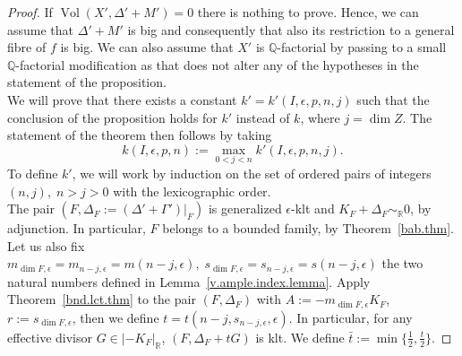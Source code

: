 \documentclass{amsart}[12pt,a4paper]
\theoremstyle{definition}
\DeclareMathOperator{\Vol}{\mathrm{Vol}}
\newcommand{\rr}{\mathbb{R}}
\newcommand{\sje}{s_{n-j, \epsilon}}
\newcommand{\mje}{m_{n-j, \epsilon}}
\newcommand{\mfe}{m_{\dim F, \epsilon}}
\newcommand{\sfe}{s_{\dim F, \epsilon}}
\begin{document}
\begin{proof}
If $\Vol(X', \Delta'+M')=0$ there is nothing to prove.
Hence, we can assume that $\Delta'+M'$ is big and consequently that also its restriction to a general fibre of $f$ is big.
We can also assume that $X'$ is $\mathbb{Q}$-factorial by passing to a small $\mathbb{Q}$-factorial modification as that does not alter any of the hypotheses in the statement of the proposition.
\\
We will prove that there exists a constant $k'=k'(I, \epsilon, p, n, j)$ such that the conclusion of the proposition holds for $k'$ instead of $k$, where $j=\dim Z$.
The statement of the theorem then follows by taking 
\[
k(I, \epsilon, p, n):= \max_{0<j<n} k'(I, \epsilon, p, n, j).
\]
To define $k'$, we will work by induction on the set of ordered pairs of integers $(n, j), \; n>j>0$ with the lexicographic order.
\\
The pair  $(F, \Delta_F :=(\Delta' + \Gamma')|_F)$ is generalized $\epsilon$-klt and $K_F +  \Delta_F \sim _\rr 0$, by adjunction.
In particular, $F$ belongs to a bounded family, by Theorem~\ref{bab.thm}.
Let us also fix $\mfe=\mje=m(n-j, \epsilon) , \; \sfe=\sje=s(n-j, \epsilon)$ the two natural numbers defined in Lemma~\ref{v.ample.index.lemma}.
Apply Theorem~\ref{bnd.lct.thm} to the pair $(F, \Delta_F)$ with $A:=-m_{\dim F, \epsilon}K_F$, $r:=s_{\dim F, \epsilon}$, then we define $t=t(n-j, \sje, \epsilon)$.
In particular, for any effective divisor $G \in |-K_F|_{\mathbb{R}}$, $(F, \Delta_F+tG)$ is klt.
We define $\bar{t}:= \min\{\frac 1 2, \frac t 2\}$.


\end{proof}
\end{document}
